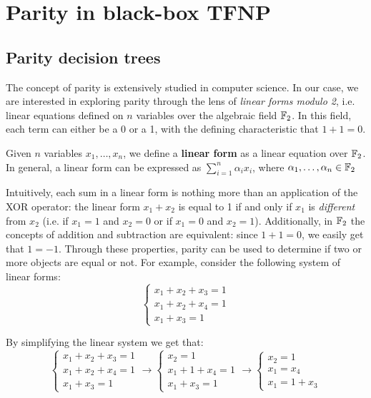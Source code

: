 
\chapter{Parity in black-box \textsf{TFNP}} \label{chap:parity-tfnp}

\section{Parity decision trees}

The concept of parity is extensively studied in computer science. In our case, we are interested in exploring parity through the lens of \textit{linear forms modulo 2}, i.e. linear equations defined on $n$ variables over the algebraic field $\mathbb{F}_2$. In this field, each term can either be a 0 or a 1, with the defining characteristic that $1+1 = 0$.

\begin{definition}
 Given $n$ variables $x_1, \ldots, x_n$, we define a \textbf{linear form} as a linear equation over $\mathbb{F}_2$. In general, a linear form can be expressed as $\sum\limits_{i = 1}^n \alpha_i x_i$, where $\alpha_1, \ldots, \alpha_n \in \mathbb{F}_2$
\end{definition}

Intuitively, each sum in a linear form is nothing more than an application of the XOR operator: the linear form $x_1 + x_2$ is equal to 1 if and only if $x_1$ is \textit{different} from $x_2$ (i.e. if $x_1 = 1$ and $x_2 = 0$ or if $x_1 = 0$ and $x_2 = 1$). Additionally, in $\mathbb{F}_2$ the concepts of addition and subtraction are equivalent: since $1+1 = 0$, we easily get that $1 = -1$. Through these properties, parity can be used to determine if two or more objects are equal or not. For example, consider the following system of linear forms:
\[\left \{ \begin{array}{l}
 x_1 + x_2 + x_3 = 1 \\
 x_1 + x_2 + x_4 = 1 \\
 x_1 + x_3 = 1
\end{array} \right .\]

By simplifying the linear system we get that:
\[\left \{ \begin{array}{l}
 x_1 + x_2 + x_3 = 1 \\
 x_1 + x_2 + x_4 = 1 \\
 x_1 + x_3 = 1
\end{array} \right . \longrightarrow
\left \{ \begin{array}{l}
 x_2 = 1\\
 x_1 + 1 + x_4 = 1 \\
 x_1 + x_3 = 1
\end{array} \right . \longrightarrow
\left \{ \begin{array}{l}
 x_2 = 1\\
 x_1 = x_4 \\
 x_1 = 1+x_3
\end{array} \right .\]

